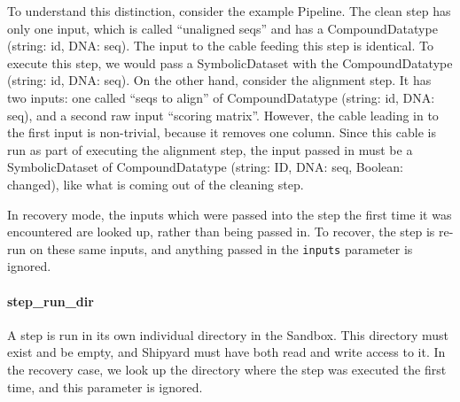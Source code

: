 \documentclass[12pt]{article}
\newcommand{\code}[1]{\texttt{#1}}
\begin{document}
To understand this distinction, consider the example Pipeline. The clean step
has only one input, which is called ``unaligned seqs'' and has a
CompoundDatatype (string: id, DNA: seq). The input to the cable feeding this
step is identical.  To execute this step, we would pass a SymbolicDataset with
the CompoundDatatype (string: id, DNA: seq). On the other hand, consider the
alignment step. It has two inputs: one called ``seqs to align'' of
CompoundDatatype (string: id, DNA: seq), and a second raw input ``scoring
matrix''. However, the cable leading in to the first input is non-trivial,
because it removes one column. Since this cable is run as part of executing the
alignment step, the input passed in must be a SymbolicDataset of
CompoundDatatype (string: ID, DNA: seq, Boolean: changed), like what is coming
out of the cleaning step.

In recovery mode, the inputs which were passed into the step the first time it
was encountered are looked up, rather than being passed in. To recover, the
step is re-run on these same inputs, and anything passed in the \code{inputs}
parameter is ignored.

\paragraph*{step\_run\_dir}

A step is run in its own individual directory in the Sandbox. This directory
must exist and be empty, and Shipyard must have both read and write access to
it. In the recovery case, we look up the directory where the step was executed
the first time, and this parameter is ignored.
\end{document}
